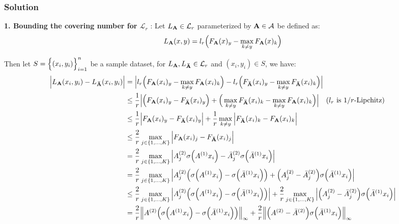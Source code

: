 \subsubsection{Solution}

\textbf{1. Bounding the covering number for $\mathcal{L}_r$} : Let $L_{\bf A} \in \mathcal{L}_r$ parameterized by ${\bf A}\in\mathcal{A}$ be defined as:
\begin{align*}
    L_{\bf A}(x, y) = l_r\Big( 
        F_{\bf A}(x)_y - \max_{k\ne y} F_{\bf A}(x)_k
     \Big)
\end{align*}

\noindent Then let $S=\Big\{ (x_i, y_i) \Big\}_{i=1}^n$ be a sample dataset, for $L_{\bf A}, L_{\bf \bar A}\in\mathcal{L}_r$ and $(x_i, y_i)\in S$, we have:
\begin{align*}
    \Big| L_{\bf A}(x_i, y_i) - L_{\bf \bar A}(x_i, y_i) \Big| &= \Big| 
        l_r\Big( 
            F_{\bf A}(x_i)_y - \max_{k\ne y} F_{\bf A}(x_i)_k
         \Big) - 
        l_r\Big( 
            F_{\bf \bar A}(x_i)_y - \max_{k\ne y} F_{\bf \bar A}(x_i)_k
         \Big)
     \Big| \\
    &\le \frac{1}{r} \Big| 
        \Big( F_{\bf A}(x_i)_y - F_{\bf \bar A}(x_i)_y \Big) +
        \Big( 
            \max_{k\ne y} F_{\bf \bar A}(x_i)_k - \max_{k\ne y} F_{\bf A}(x_i)_k
         \Big)
     \Big| \ \ \ \text{($l_r$ is $1/r$-Lipchitz)} \\
    &\le \frac{1}{r} \Big| 
        F_{\bf A}(x_i)_y - F_{\bf \bar A}(x_i)_y
     \Big| + \frac{1}{r}\max_{k\ne y}\Big| 
        F_{\bf \bar A}(x_i)_k - F_{\bf A}(x_i)_k
     \Big| \\
    &\le \frac{2}{r}\max_{j\in\{1, \dots, K\}} \Big| F_{\bf A}(x_i)_j - F_{\bf \bar A}(x_i)_j \Big| \\
    &= \frac{2}{r}\max_{j\in\{1, \dots, K\}} \Big| 
        A^{(2)}_j\sigma\Big( A^{(1)}x_i \Big) - \bar A^{(2)}_j\sigma\Big( \bar A^{(1)}x_i \Big)
     \Big| \\
    &= \frac{2}{r}\max_{j\in\{1, \dots, K\}} \Big| 
        A_j^{(2)}\Big( \sigma\Big( A^{(1)}x_i \Big) - \sigma\Big( \bar A^{(1)}x_i \Big) \Big)
        + \Big( A_j^{(2)} - \bar A_j^{(2)} \Big)\sigma\Big( \bar A^{(1)}x_i \Big) 
     \Big| \\
    &\le \frac{2}{r}\max_{j\in\{1, \dots, K\}}\Big| 
        A_j^{(2)}\Big( \sigma\Big( A^{(1)}x_i \Big) - \sigma\Big( \bar A^{(1)}x_i \Big) \Big)
     \Big| + \frac{2}{r}\max_{j\in\{1, \dots, K\}}\Big| 
        \Big( A_j^{(2)} - \bar A_j^{(2)} \Big)\sigma\Big( \bar A^{(1)}x_i \Big) 
     \Big| \\
    &= \frac{2}{r}\Big\| 
        A^{(2)}\Big( \sigma\Big( A^{(1)}x_i \Big) - \sigma\Big( \bar A^{(1)}x_i \Big) \Big)
    \Big\|_\infty + 
    \frac{2}{r}\Big\|
        \Big( A^{(2)} - \bar A^{(2)} \Big)\sigma\Big( \bar A^{(1)}x_i \Big) 
    \Big\|_\infty \\
\end{align*}
